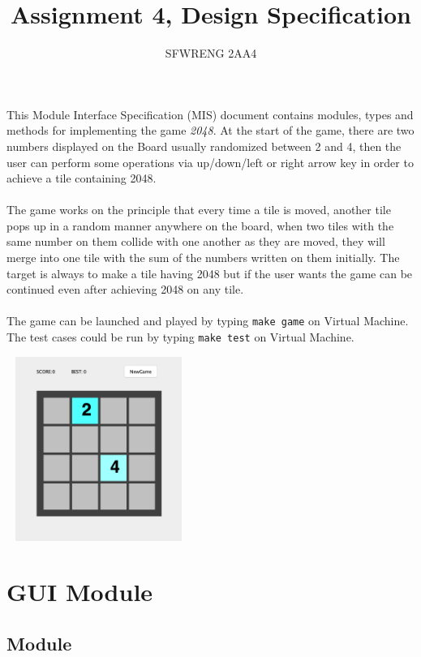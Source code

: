 \documentclass[12pt]{article}
\title{Assignment 4, Design Specification}
\author{SFWRENG 2AA4}
\begin{document}
\maketitle
This Module Interface Specification (MIS) document contains modules, types and
methods for implementing the game \textit{2048}. At the start of the game, there are two numbers displayed on the Board usually randomized between 2 and 4, then the user can perform some operations via up/down/left or right arrow key in order to achieve a tile containing 2048.\\\\ The game works on the principle that every time  a tile is moved, another tile pops up in a random manner anywhere on the board, when two tiles with the same number on them collide with one another as they are moved, they will merge into one tile with the sum of the numbers written on them initially. The target is always to make a tile having 2048 but if the user wants the game can be continued even after achieving 2048 on any tile.\\\\ The 
game can be launched and played by typing \texttt{make game} on Virtual Machine. The test cases could be run by typing \texttt{make test} on Virtual Machine.\\
\graphicspath{ {/Users/karansingh/Desktop} }
\begin{center}
\includegraphics[width=6cm, height=6cm]{img.png}
\end{center}
\newpage

\section* {GUI Module}

\subsection*{Module}
\end{document}
